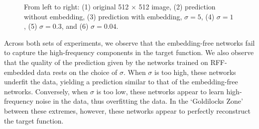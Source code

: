 \documentclass[11pt]{article}
\begin{document}
\begin{figure}[h]
\centering 
{} 
\caption{From left to right: (1) original 512 $\times$ 512 image, (2) prediction without embedding, (3) prediction with embedding, $\sigma = 5$, (4) $\sigma = 1$, (5) $\sigma = 0.3$, and (6) $\sigma = 0.04$.} \label{fig:multiimage} 
\end{figure}

\noindent Across both sets of experiments, we observe that the embedding-free networks fail to capture the high-frequency components in the target function. We also observe that the quality of the prediction given by the networks trained on RFF-embedded data rests on the choice of $\sigma$. When $\sigma$ is too high, these networks underfit the data, yielding a prediction similar to that of the embedding-free networks. Conversely, when $\sigma$ is too low, these networks appear to learn high-frequency noise in the data, thus overfitting the data. In the `Goldilocks Zone' between these extremes, however, these networks appear to perfectly reconstruct the target function.  
\end{document}

